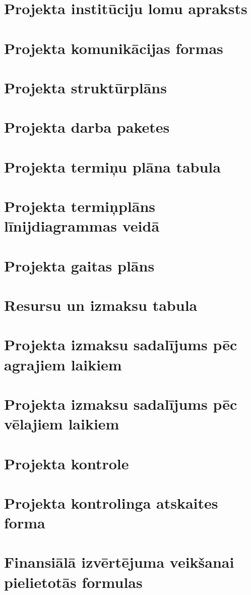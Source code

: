 \begin{appendices}
    \section{Projekta institūciju lomu apraksts}
    \label{app:pielikums21}
        \clearpage
    \section{Projekta komunikācijas formas}
    \label{app:pielikums22}
        \clearpage
    \section{Projekta struktūrplāns}
    \label{app:pielikums23}
        \clearpage
    \section{Projekta darba paketes}
    \label{app:pielikums24}
        \clearpage
    \section{Projekta termiņu plāna tabula}
    \label{app:pielikums25}
        \clearpage
    \section{Projekta termiņplāns līnijdiagrammas veidā}
    \label{app:pielikums26}
        \clearpage
    \section{Projekta gaitas plāns}
    \label{app:pielikums27}
        \clearpage
    \section{Resursu un izmaksu tabula}
    \label{app:pielikums28}
        \clearpage
    \section{Projekta izmaksu sadalījums pēc agrajiem laikiem}
    \label{app:pielikums29}
        \clearpage
    \section{Projekta izmaksu sadalījums pēc vēlajiem laikiem}
    \label{app:pielikums30}
        \clearpage
    \section{Projekta kontrole}
    \label{app:pielikums31}
        \clearpage
    \section{Projekta kontrolinga atskaites forma}
    \label{app:pielikums32}
        \clearpage
    \section{Finansiālā izvērtējuma veikšanai pielietotās formulas }
    \label{app:pielikums33}
        \clearpage
\end{appendices}
